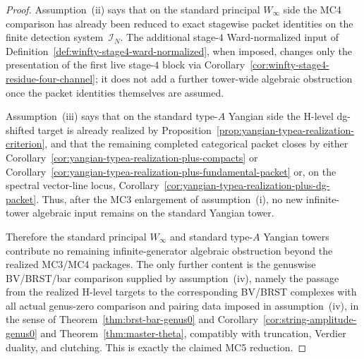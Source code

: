 \begin{proof}
Assumption~\textup{(ii)} says that on the standard principal
\texorpdfstring{$W_\infty$}{W_infty} side the MC4 comparison has
already been reduced to exact stagewise packet identities on the finite
detection system~$\mathcal{I}_N$.  The additional
stage-$4$ Ward-normalized input of
Definition~\ref{def:winfty-stage4-ward-normalized}, when imposed,
changes only the presentation of the first live stage-$4$ block via
Corollary~\ref{cor:winfty-stage4-residue-four-channel}; it does not add
a further tower-wide algebraic obstruction once the packet identities
themselves are assumed.

Assumption~\textup{(iii)} says that on the standard type-$A$ Yangian
side the H-level dg-shifted target is already realized by
Proposition~\ref{prop:yangian-typea-realization-criterion}, and that
the remaining completed categorical packet closes by either
Corollary~\ref{cor:yangian-typea-realization-plus-compacts} or
Corollary~\ref{cor:yangian-typea-realization-plus-fundamental-packet}
or, on the spectral vector-line locus,
Corollary~\ref{cor:yangian-typea-realization-plus-dg-packet}.
Thus, after the MC3 enlargement of assumption~\textup{(i)}, no new
infinite-tower algebraic input remains on the standard Yangian tower.

Therefore the standard principal \texorpdfstring{$W_\infty$}{W_infty}
and standard type-$A$ Yangian towers contribute no remaining
infinite-generator algebraic obstruction beyond the realized MC3/MC4
packages.  The only further content is the genuswise BV/BRST/bar
comparison supplied by assumption~\textup{(iv)}, namely the passage
from the realized H-level targets to the corresponding BV/BRST
complexes with all actual genus-zero comparison and pairing data imposed in assumption~\textup{(iv)}, in the sense of Theorem~\ref{thm:brst-bar-genus0} and Corollary~\ref{cor:string-amplitude-genus0} and
Theorem~\ref{thm:master-theta}, compatibly with truncation, Verdier
duality, and clutching.  This is exactly the claimed MC5 reduction.
\end{proof}

